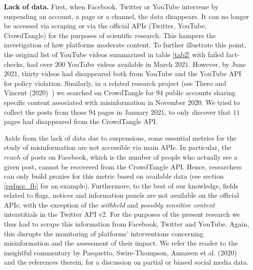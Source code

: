 \documentclass{article}
\begin{document}
{\bf Lack of data.} First, when Facebook, Twitter or YouTube intervene by suspending an account, a page or a channel, the data disappears. It can no longer be accessed via scraping or via the official APIs (Twitter, YouTube, CrowdTangle) for the purposes of scientific research. This hampers the investigation of how platforms moderate content. To further illustrate this point, the original list of YouTube videos summarized in table \ref{tab2} with failed fact-checks, had over $200$ YouTube videos available in March $2021$. However, by June $2021$, thirty videos had disappeared both from YouTube and the YouTube API for policy violation. Similarly, in a related research project (see Thero and Vincent (2020)~\cite{therovincent}) we searched on CrowdTangle for $94$ public accounts sharing specific content associated with misinformation in November $2020$. We tried to collect the posts from those $94$ pages in January $2021$, to only discover that $11$ pages had disappeared from the CrowdTangle API.  

\smallskip 

Aside from the lack of data due to suspensions, some essential metrics for the study of misinformation are not accessible via main APIs. In particular, the $reach$ of posts on Facebook, which is the number of people who actually see a given post, cannot be recovered from the CrowdTangle API. Hence, researchers can only build proxies for this metric based on available data (see section \ref{reduce_fb} for an example). Furthermore, to the best of our knowledge, fields related to flags, notices and information panels are not available on the official APIs; with the exception of the {\it withheld}  and {\it possibly sensitive content} interstitials in the Twitter API v2. For the purposes of the present research we thus had to scrape this information from Facebook, Twitter and YouTube. Again, this disrupts the monitoring of platforms' interventions concerning misinformation and the assessment of their impact. We refer the reader to the insightful commentary by Pasquetto, Swire-Thompson, Amazeen et al. (2020)~\cite{pasquetto} and the references therein, for a discussion on partial or biased social media data.

\smallskip
\end{document}
